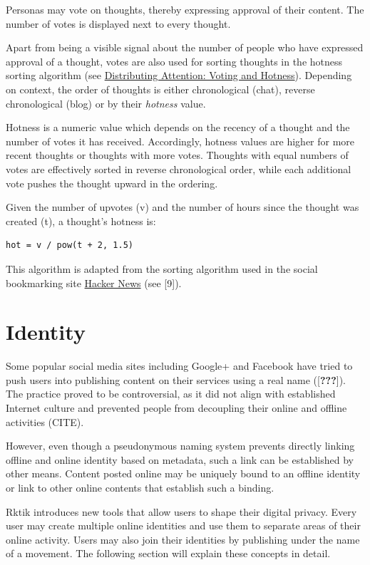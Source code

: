 Personas may vote on thoughts, thereby expressing approval of their
content. The number of votes is displayed next to every thought.

Apart from being a visible signal about the number of people who have
expressed approval of a thought, votes are also used for sorting
thoughts in the hotness sorting algorithm (see
\hyperref[hotness]{Distributing Attention: Voting and Hotness}).
Depending on context, the order of thoughts is either chronological
(chat), reverse chronological (blog) or by their \emph{hotness} value.

Hotness is a numeric value which depends on the recency of a thought and
the number of votes it has received. Accordingly, hotness values are
higher for more recent thoughts or thoughts with more votes. Thoughts
with equal numbers of votes are effectively sorted in reverse
chronological order, while each additional vote pushes the thought
upward in the ordering.

Given the number of upvotes (v) and the number of hours since the
thought was created (t), a thought's hotness is:

\begin{verbatim}
hot = v / pow(t + 2, 1.5)
\end{verbatim}

This algorithm is adapted from the sorting algorithm used in the social
bookmarking site \href{https://news.ycombinator.com/}{Hacker News} (see
{[}9{]}).

\section{Identity}\label{identity}

Some popular social media sites including Google+ and Facebook have
tried to push users into publishing content on their services using a
real name ({[}{\textbf{???}}{]}). The practice proved to be
controversial, as it did not align with established Internet culture and
prevented people from decoupling their online and offline activities
(CITE).

However, even though a pseudonymous naming system prevents directly
linking offline and online identity based on metadata, such a link can
be established by other means. Content posted online may be uniquely
bound to an offline identity or link to other online contents that
establish such a binding.

Rktik introduces new tools that allow users to shape their digital
privacy. Every user may create multiple online identities and use them
to separate areas of their online activity. Users may also join their
identities by publishing under the name of a movement. The following
section will explain these concepts in detail.

